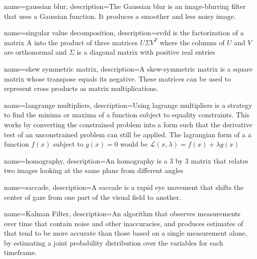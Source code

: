 
{	
	name={gaussian blur}, 
	description={The Gaussian blur is an image-blurring filter that uses a Gaussian function. It produces a smoother and less noisy image.}
}

{
	name={singular value decomposition},
	description={\acrfull{svdd} is  the  factorization  of a matrix A into  the product of three matrices $U$$\Sigma$$V^T$   where the columns of $U$ and $V$ are orthonormal and $\Sigma$ is a diagonal matrix with positive real entries}
}

{
	name={skew symmetric matrix},
	description={A skew-symmetric matrix is a square matrix whose transpose equals its negative. These matrices can be used to represent cross products as matrix multiplications.}
}

{
	name={langrange multipliers},
	description={Using lagrange multipliers is a strategy to find the minima or maxima of a function subject to equality constraints. This works by converting the constrained problem into a form such that the derivative test of an unconstrained problem can still be applied. The lagrangian form of a a function $f(x)$ subject to $g(x) = 0$ would be $\mathcal{L}(x, \lambda)=f(x)+\lambda g(x)$}
}

{
	name={homography},
	description={An homography is a 3 by 3 matrix that relates two images looking at the same plane from different angles}
}

{
	name={saccade},
	description={A saccade is a rapid eye movement that shifts the center of gaze from one part of the visual field to another.}
}

{
	name={Kalman Filter},
	description={An algorithm that observes measurements over time that contain noise and other inaccuracies, and produces estimates of that tend to be more accurate than those based on a single measurement alone, by estimating a joint probability distribution over the variables for each timeframe.}
}